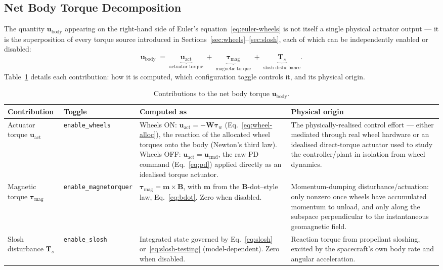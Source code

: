 \subsection{Net Body Torque Decomposition}
\label{sec:u-body-detail}

The quantity $\bm{u}_{\text{body}}$ appearing on the right-hand side of
Euler's equation~\eqref{eq:euler-wheels} is not itself a single physical
actuator output --- it is the superposition of every torque source
introduced in Sections~\ref{sec:wheels}--\ref{sec:slosh}, each of which can
be independently enabled or disabled:
\begin{equation}
\bm{u}_{\text{body}}
\;=\;
\underbrace{\bm{u}_{\text{act}}}_{\text{actuator torque}}
\;+\;
\underbrace{\bm{\tau}_{\text{mag}}}_{\text{magnetic torque}}
\;+\;
\underbrace{\bm{T}_{\!s}}_{\text{slosh disturbance}}.
\label{eq:u-body-full}
\end{equation}
Table~\ref{tab:u-body-terms} details each contribution: how it is
computed, which configuration toggle controls it, and its physical origin.

\begin{table}[h]
\centering
\caption{Contributions to the net body torque $\bm{u}_{\text{body}}$.}
\label{tab:u-body-terms}
\begin{tabular}{@{}p{2.6cm}p{2.3cm}p{4.6cm}p{4.5cm}@{}}
\toprule
\textbf{Contribution} & \textbf{Toggle} & \textbf{Computed as} & \textbf{Physical origin} \\
\midrule
Actuator torque $\bm{u}_{\text{act}}$
 & \texttt{enable\_wheels}
 & Wheels ON: $\bm{u}_{\text{act}} = -\bm{W}\bm{\tau}_w$
   (Eq.~\ref{eq:wheel-alloc}), the reaction of the allocated wheel
   torques onto the body (Newton's third law).\newline
   Wheels OFF: $\bm{u}_{\text{act}} = \bm{u}_{\text{cmd}}$, the raw PD
   command (Eq.~\ref{eq:pd}) applied directly as an idealised torque
   actuator.
 & The physically-realised control effort — either mediated through
   real wheel hardware or an idealised direct-torque actuator used to
   study the controller/plant in isolation from wheel dynamics. \\[6pt]
Magnetic torque $\bm{\tau}_{\text{mag}}$
 & \texttt{enable\_magnetorquer}
 & $\bm{\tau}_{\text{mag}} = \bm{m}\times\bm{B}$, with $\bm{m}$ from the
   $\bm{B}$-dot--style law, Eq.~\ref{eq:bdot}. Zero when disabled.
 & Momentum-dumping disturbance/actuation: only nonzero once wheels
   have accumulated momentum to unload, and only along the subspace
   perpendicular to the instantaneous geomagnetic field. \\[6pt]
Slosh disturbance $\bm{T}_{\!s}$
 & \texttt{enable\_slosh}
 & Integrated state governed by Eq.~\ref{eq:slosh}
   or~\ref{eq:slosh-testing} (model-dependent). Zero when disabled.
 & Reaction torque from propellant sloshing, excited by the
   spacecraft's own body rate and angular acceleration. \\
\bottomrule
\end{tabular}
\end{table}

